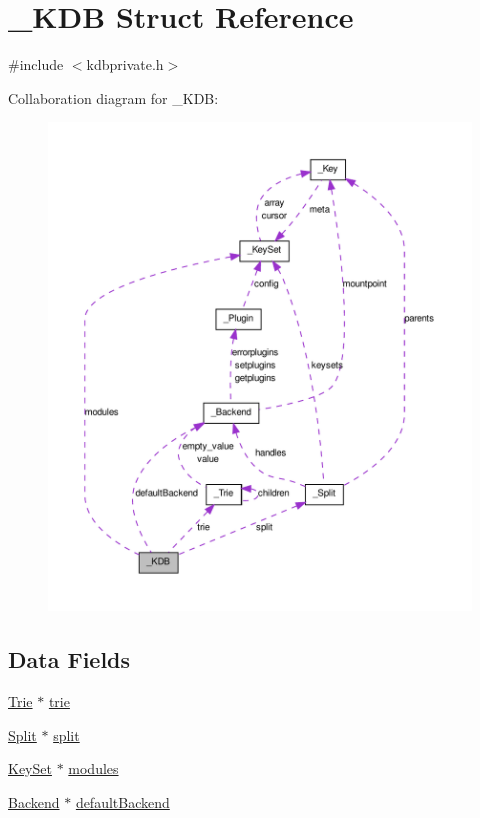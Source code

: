 \hypertarget{struct__KDB}{
\section{\_\-KDB Struct Reference}
\label{struct__KDB}
}


{\ttfamily \#include $<$kdbprivate.h$>$}



Collaboration diagram for \_\-KDB:
\nopagebreak
\begin{figure}[H]
\begin{center}
\leavevmode
\includegraphics[width=400pt]{struct__KDB__coll__graph}
\end{center}
\end{figure}
\subsection*{Data Fields}
\begin{DoxyCompactItemize}
\item 
\hyperlink{struct__Trie}{Trie} $\ast$ \hyperlink{struct__KDB_afbad422f11b1a72aaf6dc8909d60da17}{trie}
\item 
\hyperlink{struct__Split}{Split} $\ast$ \hyperlink{struct__KDB_ae301239675a86338980067c82c5134a9}{split}
\item 
\hyperlink{struct__KeySet}{KeySet} $\ast$ \hyperlink{struct__KDB_a1ecf6a6a2a46222f243bbfc4c97015c6}{modules}
\item 
\hyperlink{struct__Backend}{Backend} $\ast$ \hyperlink{struct__KDB_a93951ad0fd6e131da9bb1035d5a69c13}{defaultBackend}
\end{DoxyCompactItemize}


